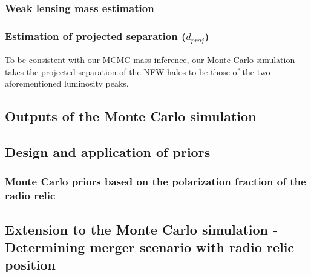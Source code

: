 \subsubsection{Weak lensing mass estimation} 



\subsubsection{Estimation of projected separation ($d_{proj}$) } 
To be consistent with our MCMC mass inference, our Monte Carlo simulation takes 
the projected separation of the NFW halos to be those of the two aforementioned 
luminosity peaks.

\subsection{Outputs of the Monte Carlo simulation}
\label{sec: outputs}


\subsection{Design and application of priors} 
\label{sec:priors}


\subsubsection{Monte Carlo priors based on the polarization fraction of the radio relic}


\subsection{Extension to the Monte Carlo simulation - Determining merger scenario with radio relic position}
\label{sec: positionprior}


